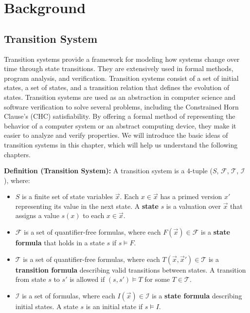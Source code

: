 \chapter{Background}

\section{Transition System}
\noindent Transition systems provide a framework for modeling how systems change over time through state transitions. They are extensively used in formal methods, program analysis, and verification. Transition systems consist of a set of initial states, a set of states, and a transition relation that defines the evolution of states. Transition systems are used as an abstraction in computer science and software verification to solve several problems, including the Constrained Horn Clause's (CHC) satisfiability. By offering a formal method of representing the behavior of a computer system or an abstract computing device, they make it easier to analyze and verify properties. We will introduce the basic ideas of transition systems in this chapter, which will help us understand the following chapters.

\vspace{\baselineskip}\noindent\textbf{Definition (Transition System)\cite{7886665}:} A transition system is a 4-tuple ($S$, $\mathcal{F}$, $\mathcal{T}$, $\mathcal{I}$), where:
\begin{itemize}
    \item \( S \) is a finite set of state variables \( \vec{x} \). Each \( x \in \vec{x} \) has a primed version \( x' \) representing its value in the next state. A \textbf{state} \( s \) is a valuation over \( \vec{x} \) that assigns a value \( s(x) \) to each \( x \in \vec{x} \).
    \item \( \mathcal{F} \) is a set of quantifier-free formulas, where each \( F(\vec{x}) \in \mathcal{F} \) is a \textbf{state formula} that holds in a state \( s \) if \( s \models F \).
    \item \( \mathcal{T} \) is a set of quantifier-free formulas, where each \( T(\vec{x}, \vec{x}') \in \mathcal{T} \) is a \textbf{transition formula} describing valid transitions between states. A transition from state \( s \) to \( s' \) is allowed if \( (s, s') \models T \) for some \( T \in \mathcal{T} \).
    \item \( \mathcal{I} \) is a set of formulas, where each \( I(\vec{x}) \in \mathcal{I} \) is a \textbf{state formula} describing initial states. A state \( s \) is an initial state if \( s \models I \).
\end{itemize}


